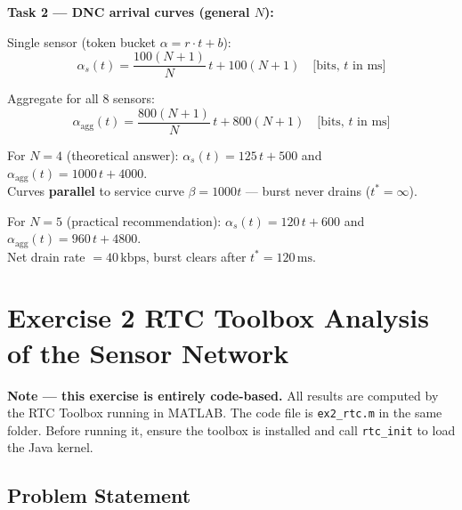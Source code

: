 \documentclass[12pt, a4paper]{article}
\begin{document}
\begin{keybox}
\textbf{Task 2 --- DNC arrival curves (general $N$):}

\vspace{4pt}
Single sensor (token bucket $\alpha = r \cdot t + b$):
\[
  \alpha_s(t) = \frac{100(N+1)}{N}\,t + 100(N+1)
  \quad \text{[bits, $t$ in ms]}
\]

\vspace{4pt}
Aggregate for all 8 sensors:
\[
  \alpha_\text{agg}(t) = \frac{800(N+1)}{N}\,t + 800(N+1)
  \quad \text{[bits, $t$ in ms]}
\]

\vspace{4pt}
For $N = 4$ (theoretical answer):
$\alpha_s(t) = 125\,t + 500$ and
$\alpha_\text{agg}(t) = 1000\,t + 4000$. \\
Curves \textbf{parallel} to service curve $\beta = 1000t$ --- burst never drains ($t^* = \infty$).

\vspace{4pt}
For $N = 5$ (practical recommendation):
$\alpha_s(t) = 120\,t + 600$ and
$\alpha_\text{agg}(t) = 960\,t + 4800$. \\
Net drain rate $= 40\,\text{kbps}$, burst clears after $t^* = 120\,\text{ms}$.
\end{keybox}

\newpage
\section*{Exercise 2 \quad RTC Toolbox Analysis of the Sensor Network}

\begin{notebox}
  \textbf{Note --- this exercise is entirely code-based.}
  All results are computed by the RTC Toolbox running in MATLAB.
  The code file is \texttt{ex2\_rtc.m} in the same folder.
  Before running it, ensure the toolbox is installed and call \texttt{rtc\_init}
  to load the Java kernel.
\end{notebox}

\subsection*{Problem Statement}
\end{document}
